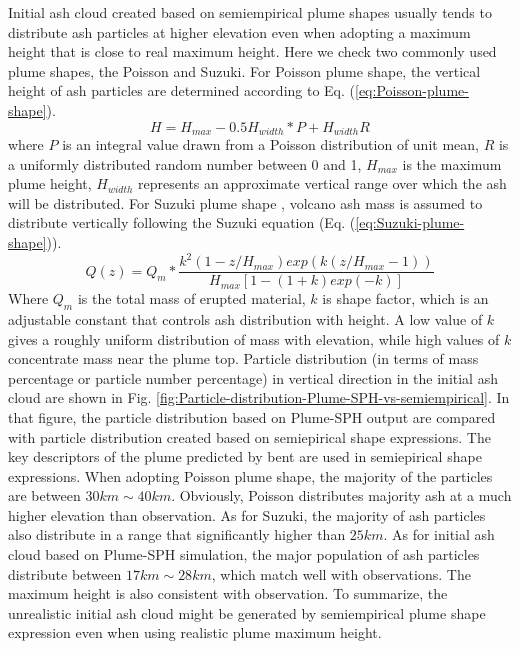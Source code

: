 Initial ash cloud created based on semiempirical plume shapes usually tends to distribute ash particles at higher elevation even when adopting a maximum height that is close to real maximum height. Here we check two commonly used plume shapes, the Poisson and Suzuki.
For Poisson plume shape, the vertical height of ash particles are determined according to Eq. (\ref{eq:Poisson-plume-shape}).
\begin{equation}
H=H_{max} - 0.5 H_{width}*P+H_{width}R
\label{eq:Poisson-plume-shape}
\end{equation}
where $P$ is an integral value drawn from a Poisson
distribution of unit mean, $R$ is a uniformly distributed random number between 0 and 1, $H_{max}$ is the maximum plume height, $H_{width}$ represents an approximate vertical range over which the ash will be distributed.
For Suzuki plume shape \citep{suzuki1983theoretical}, volcano ash mass is assumed to distribute vertically following the Suzuki equation (Eq. (\ref{eq:Suzuki-plume-shape})).
\begin{equation}
Q(z)=Q_m* \frac{k^2(1-z/H_{max})exp\left(k(z/H_{max} -1 )\right)}{H_{max}\left[1-(1+k)exp(-k)\right]}
\label{eq:Suzuki-plume-shape}
\end{equation}
Where $Q_m$ is the total mass of erupted material, $k$ is shape factor, which is an adjustable constant that controls ash distribution with height. A low value of $k$ gives a roughly uniform distribution of mass with elevation, while high values of $k$ concentrate mass near the plume top.
Particle distribution (in terms of mass percentage or particle number percentage) in vertical direction in the initial ash cloud are shown in Fig. \ref{fig:Particle-distribution-Plume-SPH-vs-semiempirical}. In that figure, the particle distribution based on Plume-SPH output are compared with particle distribution created based on semiepirical shape expressions. The key descriptors of the plume predicted by bent are used in semiepirical shape expressions. When adopting Poisson plume shape, the majority of the particles are between $30 km \sim 40 km$. Obviously, Poisson distributes majority ash at a much higher elevation than observation. As for Suzuki, the majority of ash particles also distribute in a range that significantly higher than $25 km$. As for initial ash cloud based on Plume-SPH simulation, the major population of ash particles distribute between $17 km \sim 28 km$, which match well with observations. The maximum height is also consistent with observation. To summarize, the unrealistic initial ash cloud might be generated by semiempirical plume shape expression even when using realistic plume maximum height.

